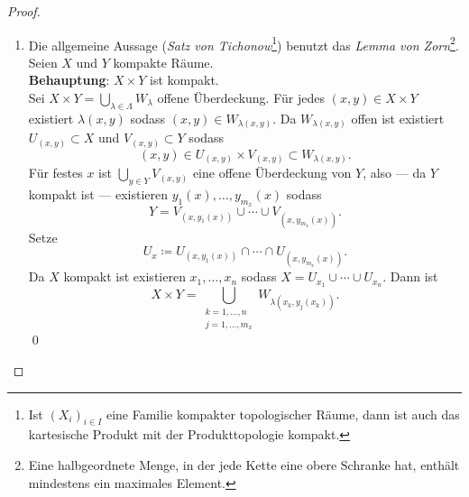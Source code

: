 \begin{theorem}
\begin{proof}
\begin{enumerate}
        \begin{equation*}
          X = (X \setminus A) \cup V_{i_1} \cup \cdots \cup V_{i_k} \Rightarrow A = X \cap A
        \end{equation*}
        also
        \begin{equation*}
          A = X \cap A = \left( V_{i_1} \cup \cdots \cup V_{i_k} \right) \cap A = U_{i_1} \cup \cdots \cup U_{i_k}\text{.}
        \end{equation*}
        \qed{}
      \item Die allgemeine Aussage (\emph{Satz von Tichonow}\footnote{Ist \( {(X_i)}_{i \in I} \) eine Familie kompakter topologischer Räume, dann ist auch das kartesische Produkt mit der Produkttopologie kompakt.}) benutzt das \emph{Lemma von Zorn}\footnote{Eine halbgeordnete Menge, in der jede Kette eine obere Schranke hat, enthält mindestens ein maximales Element.}. \\
        Seien \( X \) und \( Y \) kompakte Räume. \\
        \textbf{Behauptung}: \( X \times Y \) ist kompakt. \\
        Sei \( X \times Y = \bigcup_{\lambda \in \Lambda} W_\lambda \) offene Überdeckung. Für jedes \( (x, y) \in X \times Y \) existiert \( \lambda(x, y) \) sodass \( (x,y) \in W_{\lambda(x,y)} \). Da \( W_{\lambda(x,y)} \) offen ist existiert \( U_{(x,y)} \subset X \) und \( V_{(x,y)} \subset Y \) sodass
        \begin{equation*}
          (x,y) \in U_{(x,y)} \times V_{(x,y)} \subset W_{\lambda(x,y)}\text{.}
        \end{equation*}
        Für festes \( x \) ist \( \bigcup_{y \in Y} V_{(x,y)} \) eine offene Überdeckung von \( Y \), also --- da \( Y \) kompakt ist --- existieren \( y_1(x),\dots,y_{m_x}(x) \) sodass
        \begin{equation*}
          Y = V_{(x, y_1(x))} \cup \cdots \cup V_{(x,y_{m_x}(x))}\text{.}
        \end{equation*}
        Setze
        \begin{equation*}
          U_x \coloneqq U_{(x,y_1(x))} \cap \cdots \cap U_{(x, y_{m_x}(x))}\text{.}
        \end{equation*}
        Da \( X \) kompakt ist existieren \( x_1, \dots, x_n \) sodass \( X = U_{x_1} \cup \cdots \cup U_{x_n} \). Dann ist
        \begin{equation*}
          X \times Y = \bigcup_{\substack{k = 1, \dots, n \\ j = 1, \dots, m_x}}W_{\lambda(x_k, y_j(x_k))}\text{.}
        \end{equation*}
        \qed{}
    \end{enumerate}
  \end{proof}
\end{theorem}

